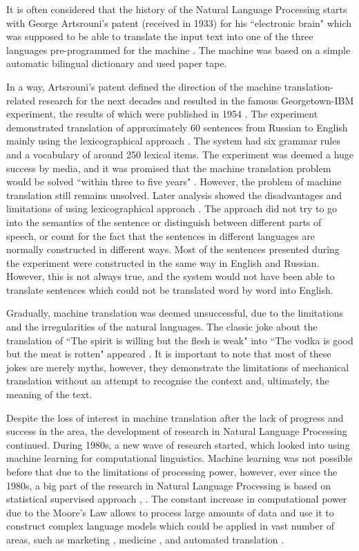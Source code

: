 It is often considered that the history of the Natural Language Processing starts with George Artsrouni's patent (received in 1933) for his ``electronic brain" which was supposed to be able to translate the input text into one of the three languages pre-programmed for the machine \cite{hutchins2004two}. The machine was based on a simple automatic bilingual dictionary and used paper tape. 

In a way, Artsrouni's patent defined the direction of the machine translation-related research for the next decades and resulted in the famous Georgetown-IBM experiment, the results of which were published in 1954 \cite{dostert1955georgetown}. The experiment demonstrated translation of approximately 60 sentences from Russian to English mainly using the lexicographical approach \cite{hutchins2004georgetown}. The system had six grammar rules and a vocabulary of around 250 lexical items. The experiment was deemed a huge success by media, and it was promised that the machine translation problem would be solved ``within three to five years" \cite{plumb1954russian}. However, the problem of machine translation still remains unsolved. Later analysis showed the disadvantages and limitations of using lexicographical approach \cite{garvin1968georgetown}. The approach did not try to go into the semantics of the sentence or distinguish between different parts of speech, or count for the fact that the sentences in different languages are normally constructed in different ways. Most of the sentences presented during the experiment were constructed in the same way in English and Russian. However, this is not always true, and the system would not have been able to translate sentences which could not be translated word by word into English. 

Gradually, machine translation was deemed unsuccessful, due to the limitations and the irregularities of the natural languages. The classic joke about the translation of ``The spirit is willing but the flesh is weak" into ``The vodka is good but the meat is rotten" appeared \cite{hutchins1995whisky}. It is important to note that most of these jokes are merely myths, however, they demonstrate the limitations of mechanical translation without an attempt to recognise the context and, ultimately, the meaning of the text.

Despite the loss of interest in machine translation after the lack of progress and success in the area, the development of research in Natural Language Processing continued. During 1980s, a new wave of research started, which looked into using machine learning for computational linguistics. Machine learning was not possible before that due to the limitations of processing power, however, ever since the 1980s, a big part of the research in Natural Language Processing is based on statistical supervised approach \cite{mcqueen1995applying}, \cite{bergsma2010creating}. The constant increase in computational power due to the Moore's Law allows to process large amounts of data and use it to construct complex language models which could be applied in vast number of areas, such as marketing \cite{goldberg1999automated}, medicine \cite{demner2009can}, and automated translation \cite{brants2007large}.


